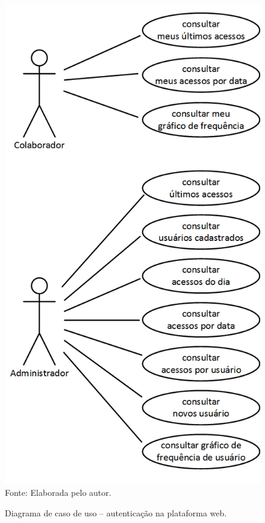 \begin{figure}[!ht]
  \begin{center}
  \caption{Diagrama de caso de uso -- autenticação na plataforma web.}
  \includegraphics[scale=0.5]{figuras/cap4/diagrama_autenticacao_web.png}\\
  Fonte: Elaborada pelo autor.
  \label{diagrama_autenticacao_web}
  \end{center}
  \end{figure}
  
